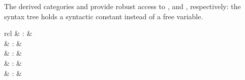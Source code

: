 \begin{isabellebody}
\begin{isamarkuptext}
  The derived categories \hypertarget{syntax.inner.num-const}{\hyperlink{syntax.inner.num-const}{\mbox{}}} and
  \hypertarget{syntax.inner.float-const}{\hyperlink{syntax.inner.float-const}{\mbox{}}} provide robust access to \hyperlink{syntax.inner.num}{\mbox{}}, and \hyperlink{syntax.inner.float-token}{\mbox{}}, respectively: the
  syntax tree holds a syntactic constant instead of a free variable.%
\end{isamarkuptext}%
\isamarkuptrue%
%
\isamarkuptrue%
%
\begin{isamarkuptext}%
\begin{matharray}{rcl}
    \hypertarget{command.nonterminal}{\hyperlink{command.nonterminal}{\mbox{}}} & : &  \\
    \hypertarget{command.syntax}{\hyperlink{command.syntax}{\mbox{}}} & : &  \\
    \hypertarget{command.no-syntax}{\hyperlink{command.no-syntax}{\mbox{}}} & : &  \\
    \hypertarget{command.translations}{\hyperlink{command.translations}{\mbox{}}} & : &  \\
    \hypertarget{command.no-translations}{\hyperlink{command.no-translations}{\mbox{}}} & : &  \\
  \end{matharray}


\end{isamarkuptext}
\end{isabellebody}
